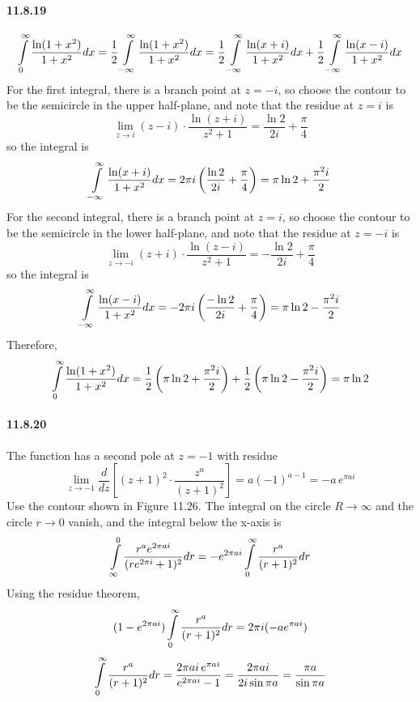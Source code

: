 \documentclass[a4paper]{article}
\begin{document}
\paragraph{11.8.19}
\[
\int\displaylimits_0^\infty\frac{\ln(1+x^2)}{1+x^2}dx=\frac{1}{2}\int\displaylimits_{-\infty}^\infty\frac{\ln(1+x^2)}{1+x^2}dx=\frac{1}{2}\int\displaylimits_{-\infty}^\infty\frac{\ln(x+i)}{1+x^2}dx+\frac{1}{2}\int\displaylimits_{-\infty}^\infty\frac{\ln(x-i)}{1+x^2}dx
\]
For the first integral, there is a branch point at $z=-i$, so choose the contour to be the semicircle in the upper half-plane, and note that the residue at $z=i$ is
\[
\lim_{z\to i}(z-i)\cdot\frac{\ln(z+i)}{z^2+1}=\frac{\ln 2}{2i}+\frac{\pi}{4}
\]
so the integral is 
\[
\int\displaylimits_{-\infty}^\infty\frac{\ln(x+i)}{1+x^2}dx=2\pi i\left(\frac{\ln 2}{2i}+\frac{\pi}{4}\right)=\pi\ln2+\frac{\pi^2 i}{2}
\]
For the second integral, there is a branch point at $z=i$, so choose the contour to be the semicircle in the lower half-plane, and note that the residue at $z=-i$ is
\[
\lim_{z\to -i}(z+i)\cdot\frac{\ln(z-i)}{z^2+1}=-\frac{\ln 2}{2i}+\frac{\pi}{4}
\]
so the integral is 
\[
\int\displaylimits_{-\infty}^\infty\frac{\ln(x-i)}{1+x^2}dx=-2\pi i\left(\frac{-\ln 2}{2i}+\frac{\pi}{4}\right)=\pi\ln2-\frac{\pi^2 i}{2}
\]
Therefore,
\[
\int\displaylimits_0^\infty\frac{\ln(1+x^2)}{1+x^2}dx=\frac{1}{2}\left(\pi\ln2+\frac{\pi^2 i}{2}\right)+\frac{1}{2}\left(\pi\ln2-\frac{\pi^2 i}{2}\right)=\pi\ln 2
\]

\paragraph{11.8.20}
The function has a second pole at $z=-1$ with residue
\[
\lim_{z\to-1}\frac{d}{dz}\left[(z+1)^2\cdot\frac{z^a}{(z+1)^2} \right]=a(-1)^{a-1}=-a\,e^{\pi ai}
\]
Use the contour shown in Figure 11.26. The integral on the circle $R\to\infty$ and the circle $r\to0$ vanish, and the integral below the x-axis is
\[
\int\displaylimits_{\infty}^0\frac{r^ae^{2\pi ai}}{(re^{2\pi i}+1)^2}dr=-e^{2\pi ai}\int\displaylimits_{0}^\infty\frac{r^a}{(r+1)^2}dr
\]
Using the residue theorem,
\[
(1-e^{2\pi ai})\int\displaylimits_{0}^\infty\frac{r^a}{(r+1)^2}dr=2\pi i(-ae^{\pi ai})
\]
\[
\int\displaylimits_0^\infty\frac{r^a}{(r+1)^2}dr=\frac{2\pi ai\,e^{\pi ai}}{e^{2\pi ai}-1}=\frac{2\pi ai}{2i\sin\pi a}=\frac{\pi a}{\sin\pi a}
\]
\end{document}

